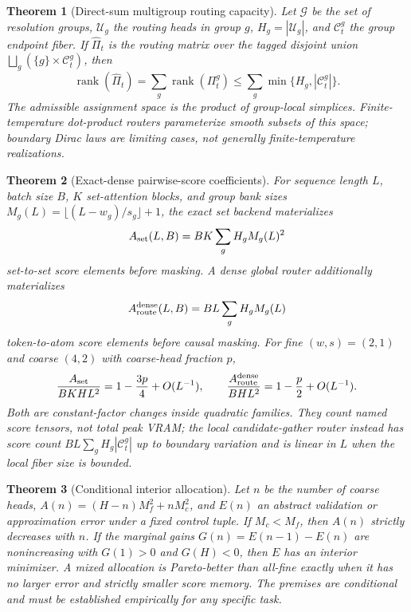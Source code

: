 \documentclass{article}
\theoremstyle{plain}
\newtheorem{theorem}{Theorem}[section]
\theoremstyle{definition}
\theoremstyle{remark}
\begin{document}
\begin{theorem}[Direct-sum multigroup routing capacity]
\label{thm:main-multigroup-routing-capacity}
Let $\mathcal G$ be the set of resolution groups, $\mathcal U_g$ the routing heads in group $g$, $H_g=|\mathcal U_g|$, and $\mathcal C_t^g$ the group endpoint fiber.  If $\widehat\Pi_t$ is the routing matrix over the tagged disjoint union $\bigsqcup_g(\{g\}\times\mathcal C_t^g)$, then
\begin{equation}
\label{eq:main-multigroup-routing-capacity}
\operatorname{rank}(\widehat\Pi_t)=\sum_g \operatorname{rank}(\Pi_t^g)
\le \sum_g \min\{H_g,|\mathcal C_t^g|\}.
\end{equation}
The admissible assignment space is the product of group-local simplices.  Finite-temperature dot-product routers parameterize smooth subsets of this space; boundary Dirac laws are limiting cases, not generally finite-temperature realizations.
\end{theorem}

\begin{theorem}[Exact-dense pairwise-score coefficients]
\label{thm:main-exact-dense-memory-coefficient}
For sequence length $L$, batch size $B$, $K$ set-attention blocks, and group
bank sizes $M_g(L)=\lfloor(L-w_g)/s_g\rfloor+1$, the exact set backend
materializes
\begin{equation}
\label{eq:main-score-count}
A_{\rm set}(L,B)=BK\sum_g H_gM_g(L)^2
\end{equation}
set-to-set score elements before masking.  A dense global router additionally
materializes
\begin{equation}
\label{eq:main-router-score-count}
A_{\rm route}^{\rm dense}(L,B)=BL\sum_g H_gM_g(L)
\end{equation}
token-to-atom score elements before causal masking.  For fine
$(w,s)=(2,1)$ and coarse $(4,2)$ with coarse-head fraction $p$,
\begin{equation}
\label{eq:main-blur-coefficient}
\frac{A_{\rm set}}{BKHL^2}=1-\frac{3p}{4}+O(L^{-1}),
\qquad
\frac{A_{\rm route}^{\rm dense}}{BHL^2}=1-\frac{p}{2}+O(L^{-1}).
\end{equation}
Both are constant-factor changes inside quadratic families.  They count named
score tensors, not total peak VRAM; the local candidate-gather router instead
has score count $BL\sum_gH_g|\mathcal C_t^g|$ up to boundary variation and is
linear in $L$ when the local fiber size is bounded.
\end{theorem}

\begin{theorem}[Conditional interior allocation]
\label{thm:main-conditional-interior-allocation}
Let $n$ be the number of coarse heads, $A(n)=(H-n)M_f^2+nM_c^2$, and $E(n)$ an abstract validation or approximation error under a fixed control tuple.  If $M_c<M_f$, then $A(n)$ strictly decreases with $n$.  If the marginal gains $G(n)=E(n-1)-E(n)$ are nonincreasing with $G(1)>0$ and $G(H)<0$, then $E$ has an interior minimizer.  A mixed allocation is Pareto-better than all-fine exactly when it has no larger error and strictly smaller score memory.  The premises are conditional and must be established empirically for any specific task.
\end{theorem}
\end{document}
